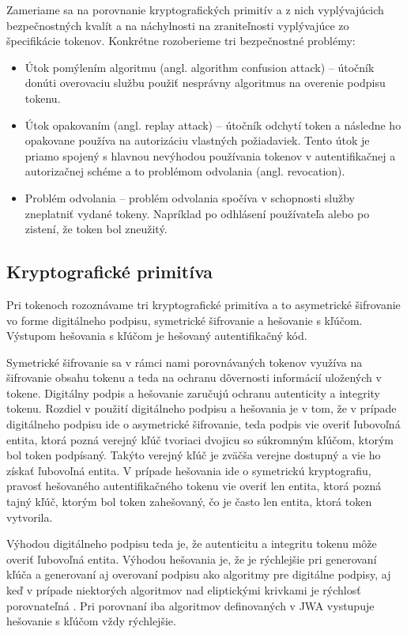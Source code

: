 Zameriame sa na porovnanie kryptografických primitív a z nich vyplývajúcich bezpečnostných kvalít a na náchylnosti na zraniteľnosti vyplývajúce zo špecifikácie tokenov. Konkrétne rozoberieme tri bezpečnostné problémy:


\begin{itemize}
  \item Útok pomýlením algoritmu (angl. algorithm confusion attack) -- útočník donúti overovaciu službu použiť nesprávny algoritmus na overenie podpisu tokenu. 
  \item Útok opakovaním (angl. replay attack) -- útočník odchytí token a následne ho opakovane používa na autorizáciu vlastných požiadaviek. Tento útok je priamo spojený s hlavnou nevýhodou používania tokenov v autentifikačnej a autorizačnej schéme a to problémom odvolania (angl. revocation).
  \item Problém odvolania -- problém odvolania spočíva v schopnosti služby zneplatniť vydané tokeny. Napríklad po odhlásení používateľa alebo po zistení, že token bol zneužitý.
\end{itemize}


\subsection{Kryptografické primitíva}

Pri tokenoch rozoznávame tri kryptografické primitíva a to asymetrické šifrovanie vo forme digitálneho podpisu, symetrické šifrovanie a hešovanie s kľúčom. Výstupom hešovania s kľúčom je hešovaný autentifikačný kód. 

Symetrické šifrovanie sa v rámci nami porovnávaných tokenov využíva na šifrovanie obsahu tokenu a teda na ochranu dôvernosti informácií uložených v tokene. Digitálny podpis a hešovanie zaručujú ochranu autenticity a integrity tokenu. Rozdiel v použití digitálneho podpisu a hešovania je v tom, že v prípade digitálneho podpisu ide o asymetrické šifrovanie, teda  podpis vie overiť ľubovoľná entita, ktorá pozná verejný kľúč tvoriaci dvojicu so súkromným kľúčom, ktorým bol token podpísaný. Takýto verejný kľúč je zväčša verejne dostupný a vie ho získať ľubovoľná entita. V prípade hešovania ide o symetrickú kryptografiu, pravosť hešovaného autentifikačného tokenu vie overiť len entita, ktorá pozná tajný kľúč, ktorým bol token zahešovaný, čo je často len entita, ktorá token vytvorila.

Výhodou digitálneho podpisu teda je, že autenticitu a integritu tokenu môže overiť ľubovoľná entita. Výhodou hešovania je, že je rýchlejšie pri generovaní kľúča a generovaní aj overovaní podpisu ako algoritmy pre digitálne podpisy, aj keď v prípade niektorých algoritmov nad eliptickými krivkami je rýchlosť porovnateľná \cite{hmac_perf}. Pri porovnaní iba algoritmov definovaných v JWA \cite{hmac_jwt_perf} vystupuje hešovanie s kľúčom vždy rýchlejšie.

